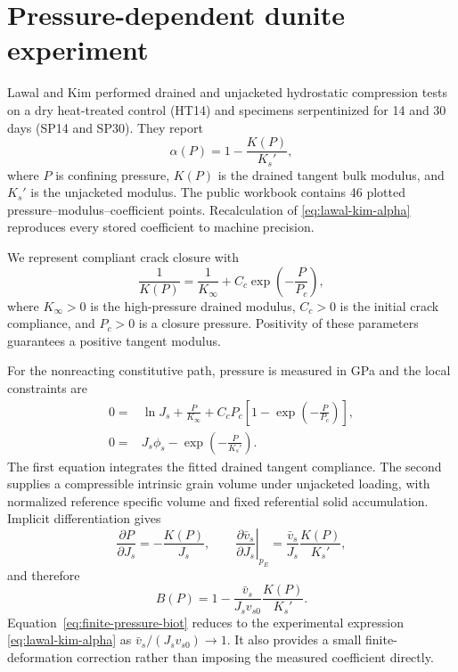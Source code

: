 \section{Pressure-dependent dunite experiment}

Lawal and Kim \citep{lawal2026} performed drained and unjacketed hydrostatic
compression tests on a dry heat-treated control (HT14) and specimens
serpentinized for 14 and 30 days (SP14 and SP30).  They report
\begin{equation}
 \alpha(P)=1-\frac{K(P)}{K_s'},
 \label{eq:lawal-kim-alpha}
\end{equation}
where \(P\) is confining pressure, \(K(P)\) is the drained tangent bulk modulus,
and \(K_s'\) is the unjacketed modulus.  The public workbook contains 46 plotted
pressure--modulus--coefficient points.  Recalculation of
\cref{eq:lawal-kim-alpha} reproduces every stored coefficient to machine
precision.

We represent compliant crack closure with
\begin{equation}
 \frac{1}{K(P)}=\frac{1}{K_\infty}+C_c\exp\left(-\frac{P}{P_c}\right),
 \label{eq:crack-compliance}
\end{equation}
where \(K_\infty>0\) is the high-pressure drained modulus, \(C_c>0\) is the
initial crack compliance, and \(P_c>0\) is a closure pressure.  Positivity of
these parameters guarantees a positive tangent modulus.

For the nonreacting constitutive path, pressure is measured in GPa and the local
constraints are
\begin{align}
 0={}&\ln J_s+\frac{P}{K_\infty}
 +C_cP_c\left[1-\exp\left(-\frac{P}{P_c}\right)\right],
 \label{eq:hydrostatic-constraint}\\
 0={}&J_s\phi_s-\exp\left(-\frac{P}{K_s'}\right).
 \label{eq:grain-volume-constraint}
\end{align}
The first equation integrates the fitted drained tangent compliance.  The
second supplies a compressible intrinsic grain volume under unjacketed loading,
with normalized reference specific volume and fixed referential solid
accumulation.  Implicit differentiation gives
\begin{equation}
 \frac{\partial P}{\partial J_s}=-\frac{K(P)}{J_s},
 \qquad
 \left.\frac{\partial\bar v_s}{\partial J_s}\right|_{p_E}
 =\frac{\bar v_s}{J_s}\frac{K(P)}{K_s'},
 \label{eq:pressure-path-tangent}
\end{equation}
and therefore
\begin{equation}
 B(P)=1-\frac{\bar v_s}{J_s v_{s0}}\frac{K(P)}{K_s'}.
 \label{eq:finite-pressure-biot}
\end{equation}
Equation~\eqref{eq:finite-pressure-biot} reduces to the experimental expression
\eqref{eq:lawal-kim-alpha} as \(\bar v_s/(J_sv_{s0})\to1\).  It also provides a
small finite-deformation correction rather than imposing the measured
coefficient directly.

